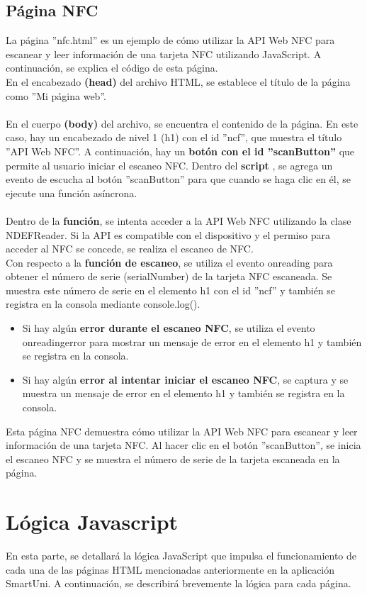 \documentclass[12pt]{report}
\begin{document}
\subsection{Página NFC}
La página ''nfc.html'' es un ejemplo de cómo utilizar la API Web NFC para escanear y leer información de una tarjeta NFC utilizando JavaScript. A continuación, se explica el código de esta página. \\En el encabezado \textbf{(head) }del archivo HTML, se establece el título de la página como ''Mi página web''.
\\\\En el cuerpo \textbf{(body)} del archivo, se encuentra el contenido de la página. En este caso, hay un encabezado de nivel 1 (h1) con el id ''ncf'', que muestra el título ''API Web NFC''.
A continuación, hay un \textbf{botón con el id ''scanButton''} que permite al usuario iniciar el escaneo NFC.
Dentro del \textbf{script} , se agrega un evento de escucha al botón ''scanButton'' para que cuando se haga clic en él, se ejecute una función asíncrona.
\\\\Dentro de la \textbf{función}, se intenta acceder a la API Web NFC utilizando la clase NDEFReader. Si la API es compatible con el dispositivo y el permiso para acceder al NFC se concede, se realiza el escaneo de NFC.
\\Con respecto a la \textbf{función de escaneo}, se utiliza el evento onreading para obtener el número de serie (serialNumber) de la tarjeta NFC escaneada. Se muestra este número de serie en el elemento h1 con el id ''ncf'' y también se registra en la consola mediante console.log(). 
    \begin{itemize}
        \item Si hay algún \textbf{error durante el escaneo NFC}, se utiliza el evento onreadingerror para mostrar un mensaje de error en el elemento h1 y también se registra en la consola.
        
        \item Si hay algún \textbf{error al intentar iniciar el escaneo NFC}, se captura y se muestra un mensaje de error en el elemento h1 y también se registra en la consola.
    \end{itemize}
Esta página NFC demuestra cómo utilizar la API Web NFC para escanear y leer información de una tarjeta NFC. Al hacer clic en el botón ''scanButton'', se inicia el escaneo NFC y se muestra el número de serie de la tarjeta escaneada en la página.

\section{Lógica Javascript}
En esta parte, se detallará la lógica JavaScript que impulsa el funcionamiento de cada una de las páginas HTML mencionadas anteriormente en la aplicación SmartUni. A continuación, se describirá brevemente la lógica para cada página.
\end{document}

